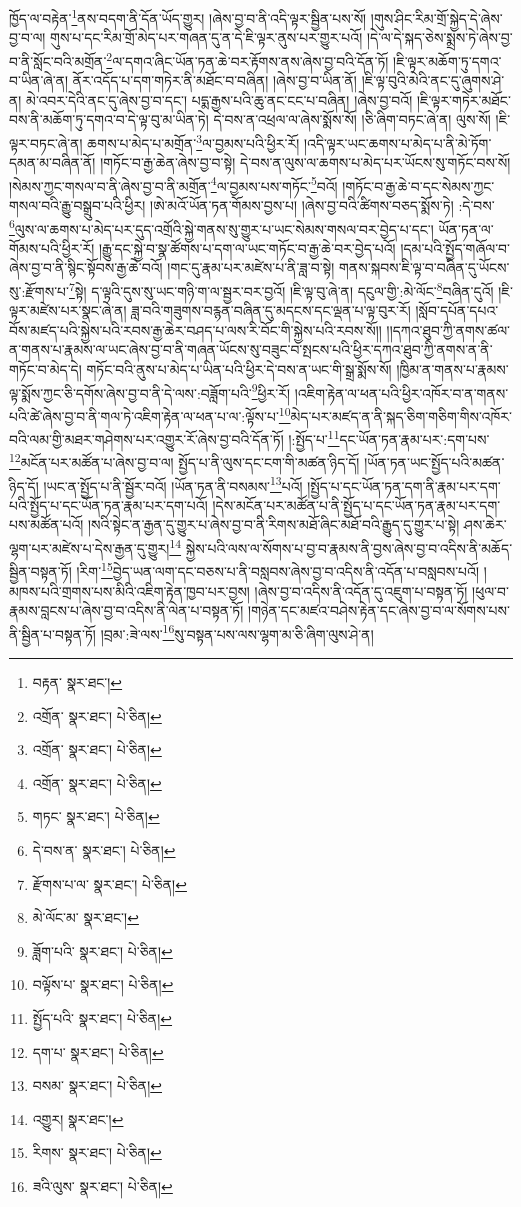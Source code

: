 ཁྱོད་ལ་བརྟེན་\footnote{བརྟན་  སྣར་ཐང་། }ནས་བདག་ནི་དོན་ཡོད་གྱུར། །ཞེས་བྱ་བ་ནི་འདི་ལྟར་སྦྱིན་པས་སོ། །གུས་ཤིང་རིམ་གྲོ་སྐྱེད་དེ་ཞེས་བྱ་བ་ལ། གུས་པ་དང་རིམ་གྲོ་མེད་པར་གཞན་དུ་ན་དེ་ཇི་ལྟར་ནུས་པར་གྱུར་པའོ། །དེ་ལ་དེ་སྐད་ཅེས་སྨྲས་ཏེ་ཞེས་བྱ་བ་ནི་སློང་བའི་མགྲོན་\footnote{འགྲོན་  སྣར་ཐང་།  པེ་ཅིན། }ལ་དགའ་ཞིང་ཡོན་ཏན་ཆེ་བར་རྟོགས་ནས་ཞེས་བྱ་བའི་དོན་ཏོ། །ཇི་ལྟར་མཆོག་ཏུ་དགའ་བ་ཡིན་ཞེ་ན། ནོར་འདོད་པ་དག་གཏེར་ནི་མཐོང་བ་བཞིན། །ཞེས་བྱ་བ་ཡིན་ནོ། །ཇི་ལྟ་བུའི་མེའི་ནང་དུ་ཞུགས་ཤེ་ན། མེ་འབར་དེའི་ནང་དུ་ཞེས་བྱ་བ་དང་། པདྨ་རྒྱས་པའི་ཆུ་ནང་ངང་པ་བཞིན། །ཞེས་བྱ་བའོ། །ཇི་ལྟར་གཏེར་མཐོང་བས་ནི་མཆོག་ཏུ་དགའ་བ་དེ་ལྟ་བུ་མ་ཡིན་ཏེ། དེ་བས་ན་འཕྲལ་ལ་ཞེས་སྨོས་སོ། །ཅི་ཞིག་བཏང་ཞེ་ན། ལུས་སོ། །ཇི་ལྟར་བཏང་ཞེ་ན། ཆགས་པ་མེད་པ་མགྲོན་\footnote{འགྲོན་  སྣར་ཐང་།  པེ་ཅིན། }ལ་བྱམས་པའི་ཕྱིར་རོ། །འདི་ལྟར་ཡང་ཆགས་པ་མེད་པ་ནི་མེ་ཏོག་དམན་མ་བཞིན་ནོ། །གཏོང་བ་རྒྱ་ཆེན་ཞེས་བྱ་བ་སྟེ། དེ་བས་ན་ལུས་ལ་ཆགས་པ་མེད་པར་ཡོངས་སུ་གཏོང་བས་སོ། །སེམས་ཀྱང་གསལ་བ་ནི་ཞེས་བྱ་བ་ནི་མགྲོན་\footnote{འགྲོན་  སྣར་ཐང་།  པེ་ཅིན། }ལ་བྱམས་པས་གཏོང་\footnote{གཏང་  སྣར་ཐང་།  པེ་ཅིན། }བའོ། །གཏོང་བ་རྒྱ་ཆེ་བ་དང་སེམས་ཀྱང་གསལ་བའི་རྒྱུ་བསྒྲུབ་པའི་ཕྱིར། །ཨེ་མའོ་ཡོན་ཏན་གོམས་བྱས་པ། །ཞེས་བྱ་བའི་ཚིགས་བཅད་སྨོས་ཏེ། :དེ་བས་\footnote{དེ་བས་ན་  སྣར་ཐང་།  པེ་ཅིན། }ལུས་ལ་ཆགས་པ་མེད་པར་དུད་འགྲོའི་སྐྱེ་གནས་སུ་གྱུར་པ་ཡང་སེམས་གསལ་བར་བྱེད་པ་དང་། ཡོན་ཏན་ལ་གོམས་པའི་ཕྱིར་རོ། །རྒྱུ་དང་སྐྱེ་བ་སྣ་ཚོགས་པ་དག་ལ་ཡང་གཏོང་བ་རྒྱ་ཆེ་བར་བྱེད་པའོ། །དམ་པའི་སྤྱོད་གཞོལ་བ་ཞེས་བྱ་བ་ནི་སྙིང་སྟོབས་རྒྱ་ཆེ་བའོ། །གང་དུ་རྣམ་པར་མཛེས་པ་ནི་ཟླ་བ་སྟེ། གནས་སྐབས་ཇི་ལྟ་བ་བཞིན་དུ་ཡོངས་སུ་:རྫོགས་པ་\footnote{རྫོགས་པ་ལ་  སྣར་ཐང་།  པེ་ཅིན། }སྟེ། ད་ལྟའི་དུས་སུ་ཡང་གཉི་ག་ལ་སྦྱར་བར་བྱའོ། །ཇི་ལྟ་བུ་ཞེ་ན། དངུལ་གྱི་:མེ་ལོང་\footnote{མེ་ལོང་མ་  སྣར་ཐང་། }བཞིན་དུའོ། །ཇི་ལྟར་མཛེས་པར་སྣང་ཞེ་ན། ཟླ་བའི་གཟུགས་བརྙན་བཞིན་དུ་མདངས་དང་ལྡན་པ་ལྟ་བུར་རོ། །སློབ་དཔོན་དཔའ་བོས་མཛད་པའི་སྐྱེས་པའི་རབས་རྒྱ་ཆེར་བཤད་པ་ལས་རི་བོང་གི་སྐྱེས་པའི་རབས་སོ།། །།དཀའ་ཐུབ་ཀྱི་ནགས་ཚལ་ན་གནས་པ་རྣམས་ལ་ཡང་ཞེས་བྱ་བ་ནི་གཞན་ཡོངས་སུ་བཟུང་བ་སྤངས་པའི་ཕྱིར་དཀའ་ཐུབ་ཀྱི་ནགས་ན་ནི་གཏོང་བ་མེད་དེ། གཏོང་བའི་ནུས་པ་མེད་པ་ཡིན་པའི་ཕྱིར་དེ་བས་ན་ཡང་གི་སྒྲ་སྨོས་སོ། །ཁྱིམ་ན་གནས་པ་རྣམས་ལྟ་སྨོས་ཀྱང་ཅི་དགོས་ཞེས་བྱ་བ་ནི་དེ་ལས་:བཟློག་པའི་\footnote{ཟློག་པའི་  སྣར་ཐང་།  པེ་ཅིན། }ཕྱིར་རོ། །འཇིག་རྟེན་ལ་ཕན་པའི་ཕྱིར་འཁོར་བ་ན་གནས་པའི་ཚེ་ཞེས་བྱ་བ་ནི་གལ་ཏེ་འཇིག་རྟེན་ལ་ཕན་པ་ལ་:ལྟོས་པ་\footnote{བལྟོས་པ་  སྣར་ཐང་།  པེ་ཅིན། }མེད་པར་མཛད་ན་ནི་སྐད་ཅིག་གཅིག་གིས་འཁོར་བའི་ལམ་གྱི་མཐར་གཤེགས་པར་འགྱུར་རོ་ཞེས་བྱ་བའི་དོན་ཏོ། །:སྤྱོད་པ་\footnote{སྤྱོད་པའི་  སྣར་ཐང་།  པེ་ཅིན། }དང་ཡོན་ཏན་རྣམ་པར་:དག་པས་\footnote{དག་པ་  སྣར་ཐང་།  པེ་ཅིན། }མངོན་པར་མཚོན་པ་ཞེས་བྱ་བ་ལ། སྤྱོད་པ་ནི་ལུས་དང་ངག་གི་མཚན་ཉིད་དོ། །ཡོན་ཏན་ཡང་སྤྱོད་པའི་མཚན་ཉིད་དོ། །ཡང་ན་སྤྱོད་པ་ནི་སྦྱོར་བའོ། །ཡོན་ཏན་ནི་བསམས་\footnote{བསམ་  སྣར་ཐང་།  པེ་ཅིན། }པའོ། །སྤྱོད་པ་དང་ཡོན་ཏན་དག་ནི་རྣམ་པར་དག་པའི་སྤྱོད་པ་དང་ཡོན་ཏན་རྣམ་པར་དག་པའོ། །དེས་མངོན་པར་མཚོན་པ་ནི་སྤྱོད་པ་དང་ཡོན་ཏན་རྣམ་པར་དག་པས་མཚོན་པའོ། །སའི་སྟེང་ན་རྒྱན་དུ་གྱུར་པ་ཞེས་བྱ་བ་ནི་རིགས་མཐོ་ཞིང་མཐོ་བའི་རྒྱུད་དུ་གྱུར་པ་སྟེ། ཤས་ཆེར་ལྷག་པར་མཛེས་པ་དེས་རྒྱན་དུ་གྱུར།\footnote{འགྱུར།  སྣར་ཐང་། } སྐྱེས་པའི་ལས་ལ་སོགས་པ་བྱ་བ་རྣམས་ནི་བྱས་ཞེས་བྱ་བ་འདིས་ནི་མཆོད་སྦྱིན་བསྟན་ཏོ། །རིག་\footnote{རིགས་  སྣར་ཐང་།  པེ་ཅིན། }བྱེད་ཡན་ལག་དང་བཅས་པ་ནི་བསླབས་ཞེས་བྱ་བ་འདིས་ནི་འདོན་པ་བསླབས་པའོ། །མཁས་པའི་གྲགས་པས་མིའི་འཇིག་རྟེན་ཁྱབ་པར་བྱས། །ཞེས་བྱ་བ་འདིས་ནི་འདོན་དུ་འཇུག་པ་བསྟན་ཏོ། །ཕུལ་བ་རྣམས་བླངས་པ་ཞེས་བྱ་བ་འདིས་ནི་ལེན་པ་བསྟན་ཏོ། །གཉེན་དང་མཛའ་བཤེས་རྟེན་དང་ཞེས་བྱ་བ་ལ་སོགས་པས་ནི་སྦྱིན་པ་བསྟན་ཏོ། །བྲམ་:ཟེ་ལས་\footnote{ཟའི་ལུས་  སྣར་ཐང་།  པེ་ཅིན། }སུ་བསྟན་པས་ལས་ལྷག་མ་ཅི་ཞིག་ལུས་ཤེ་ན། 